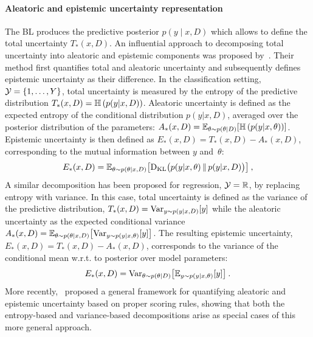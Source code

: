 \paragraph{Aleatoric and epistemic uncertainty representation}
\vspace{-0.1cm}
The BL produces the predictive posterior  $p(y\mid x,D)$ which allows to define the total uncertainty $T_*(x,D)$. An influential approach to decomposing total uncertainty into aleatoric and epistemic components was proposed by~\cite{Depeweg-Decompos-ICML2018}. Their method first quantifies total and aleatoric uncertainty and subsequently defines epistemic uncertainty as their difference. In the classification setting, ${\cal Y}=\{1,\ldots,Y\}$, total uncertainty is measured by the entropy of the predictive distribution $T_*(x,D)={\mathbb{H}\left ( {p(y|x,D)} \right ) }$. Aleatoric uncertainty is defined as the expected entropy of the conditional distribution $p(y|x,D)$, averaged over the posterior distribution of the parameters: $A_*(x,D)={\mathbb{E}}_{\theta\sim p(\theta|D)}[{\mathbb{H}\left ( {p(y|x,\theta)} \right ) }]$. Epistemic uncertainty is then defined as $E_*(x,D) = T_*(x,D) - A_*(x,D)$, corresponding to the mutual information between $y$ and~$\theta$:
\begin{equation}
\label{equ:EntropyBaseDecomposition}
  E_*(x,D) = {\mathbb{E}}_{\theta\sim p(\theta|x,D)} \big [{\rm D}_{\rm KL}\big (p(y|x,\theta)\, \|\, p(y|x,D)\big ) \big ] \:,
\end{equation}
%
A similar decomposition has been proposed for regression, ${\cal Y}=\mathbb{R}$, by replacing entropy with variance. In this case, total uncertainty is defined as the variance of the predictive distribution, $T_*(x,D)={\rm Var}_{y \sim p(y \mid x, D)} [y]$ while the aleatoric uncertainty as the expected conditional variance $A_*(x,D) = {\mathbb{E}}_{\theta \sim p(\theta \mid x,D)} \big [ {\rm Var}_{y \sim p(y \mid x, \theta)}[y] \big ]$. The resulting epistemic uncertainty, $E_*(x,D) = T_*(x,D) - A_*(x,D)$, corresponds to the variance of the conditional mean w.r.t. to posterior over model parameters:
\begin{equation}
\label{equ:VarianceBaseDecomposition}
  E_*(x,D) = {\rm Var}_{\theta\sim p(\theta|D)} \big [ {\mathbb{E}}_{y\sim p(y|x,\theta)}[y] \big ] \:.
\end{equation}
%
More recently,~\cite{Hofman-QuantifAleatoricEpistemic-Arxiv2024} proposed a general framework for quantifying aleatoric and epistemic uncertainty based on proper scoring rules, showing that both the entropy-based and variance-based decompositions arise as special cases of this more general approach.

